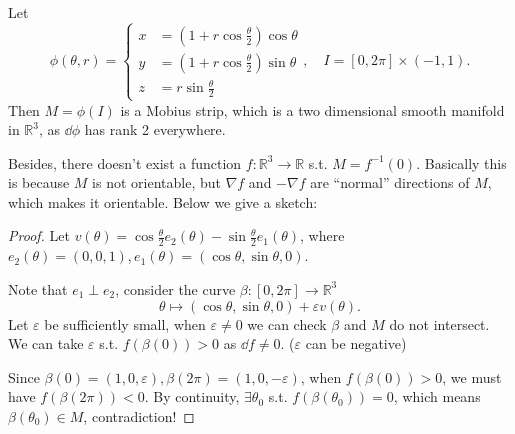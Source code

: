 \begin{example}
    Let
	\[
	\phi(\theta,r) = \left\{
	\begin{aligned}
		x &= \left(1 + r\cos\frac{\theta}{2}\right)\cos\theta\\
		y &= \left(1 + r\cos\frac{\theta}{2}\right)\sin\theta\\
		z &= r\sin\frac{\theta}{2}
	\end{aligned}\right., \quad
	I = [0, 2\pi] \times (-1, 1).
	\]
	Then $M = \phi(I)$ is a Mobius strip, which is a
	two dimensional smooth manifold in $\mathbb{R}^{3}$,
	as $\dd \phi$ has rank 2 everywhere.

	Besides, there doesn't exist a function $f: \mathbb{R}^{3}\to \mathbb{R}$
	s.t. $M = f^{-1}(0)$. Basically this is because $M$ is not
	orientable, but $\nabla f$ and $-\nabla f$ are ``normal'' directions
	of $M$, which makes it orientable.
	Below we give a sketch:
	\begin{proof}[Proof]
		Let $v(\theta) = \cos\frac{\theta}{2}e_2(\theta) -
		\sin\frac{\theta}{2}e_1(\theta)$, where
		$e_2(\theta) = (0,0,1), e_1(\theta) = (\cos\theta, \sin\theta, 0)$.

		Note that $e_1\perp e_2$, consider the curve $\beta: [0,2\pi]\to \mathbb{R}^{3}$
		\[
		\theta\mapsto (\cos\theta, \sin\theta, 0) + \varepsilon v(\theta).
		\]
		Let $\varepsilon$ be sufficiently small, when $\varepsilon\ne 0$ we
		can check $\beta$ and $M$ do not intersect.
		We can take $\varepsilon$ s.t. $f(\beta(0)) > 0$ as $\dd f\ne 0$.
		($\varepsilon$ can be negative)

		Since $\beta(0) = (1,0,\varepsilon), \beta(2\pi) = (1,0,-\varepsilon)$,
		when $f(\beta(0)) > 0$, we must have $f(\beta(2\pi)) < 0$.
		By continuity, $\exists \theta_0$ s.t. $f(\beta(\theta_0)) = 0$,
		which means $\beta(\theta_0) \in M$, contradiction!
	\end{proof}
\end{example}
